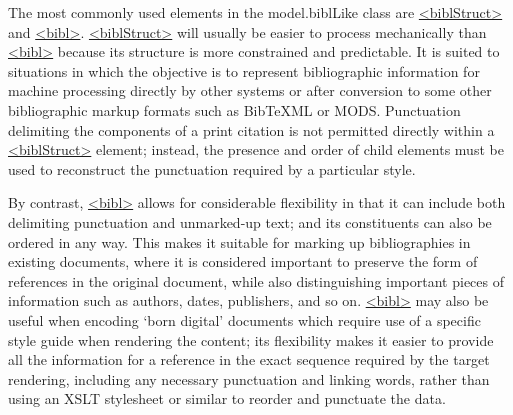 The most commonly used elements in the \textsf{model.biblLike} class are \hyperref[TEI.biblStruct]{<biblStruct>} and \hyperref[TEI.bibl]{<bibl>}. \hyperref[TEI.biblStruct]{<biblStruct>} will usually be easier to process mechanically than \hyperref[TEI.bibl]{<bibl>} because its structure is more constrained and predictable. It is suited to situations in which the objective is to represent bibliographic information for machine processing directly by other systems or after conversion to some other bibliographic markup formats such as BibTeXML or MODS. Punctuation delimiting the components of a print citation is not permitted directly within a \hyperref[TEI.biblStruct]{<biblStruct>} element; instead, the presence and order of child elements must be used to reconstruct the punctuation required by a particular style.\par
By contrast, \hyperref[TEI.bibl]{<bibl>} allows for considerable flexibility in that it can include both delimiting punctuation and unmarked-up text; and its constituents can also be ordered in any way. This makes it suitable for marking up bibliographies in existing documents, where it is considered important to preserve the form of references in the original document, while also distinguishing important pieces of information such as authors, dates, publishers, and so on. \hyperref[TEI.bibl]{<bibl>} may also be useful when encoding ‘born digital’ documents which require use of a specific style guide when rendering the content; its flexibility makes it easier to provide all the information for a reference in the exact sequence required by the target rendering, including any necessary punctuation and linking words, rather than using an XSLT stylesheet or similar to reorder and punctuate the data.\par
